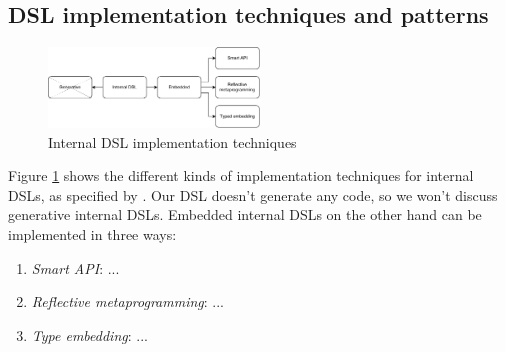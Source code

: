 \subsection{DSL implementation techniques and patterns}

\begin{figure}[!ht]
    \centering
      \includegraphics[width=0.5\textwidth]{images/DSLTechniques} 
      \caption{Internal DSL implementation techniques}
    \label{fig:DSLTechniques}
\end{figure}

Figure \ref{fig:DSLTechniques} shows the different kinds of implementation techniques for internal DSLs, as specified by \cite{Ghosh:2010}. Our DSL doesn't generate any code, so we won't discuss generative internal DSLs. Embedded internal DSLs on the other hand can be implemented in three ways: 

\begin{enumerate}
\item \textit{Smart API}: ...
\item \textit{Reflective metaprogramming}: ...
\item \textit{Type embedding}: ...
\end{enumerate}



